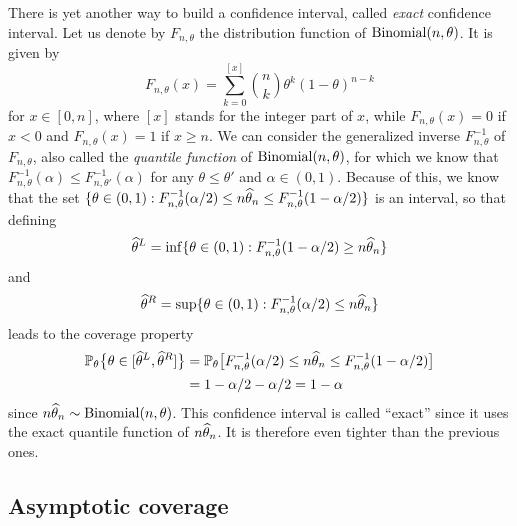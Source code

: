 There is yet another way to build a confidence interval, called \emph{exact} confidence interval.
Let us denote by $F_{n, \theta}$ the distribution function of $\operatorname{Binomial}(n, \theta)$. 
It is given by
\begin{equation}
	\label{eq:binomial_distribution}
	F_{n, \theta}(x) = \sum_{k=0}^{[x]}\binom{n}{k} \theta^k (1 - \theta)^{n - k}
\end{equation}
for $x \in [0, n]$, where $[x]$ stands for the integer part of $x$, while $F_{n, \theta}(x) = 0$ if $x < 0$ and $F_{n, \theta}(x) = 1$ if $x \geq n$.
We can consider the generalized inverse $F_{n, \theta}^{-1}$ of $F_{n, \theta}$,  also called the \emph{quantile function} of $\operatorname{Binomial}(n, \theta)$, for which we know that $F_{n, \theta}^{-1}(\alpha) \leq F_{n, \theta'}^{-1}(\alpha)$ for any $\theta \leq \theta'$ and $\alpha \in (0, 1)$.%
Because of this, we know that the set $\{ \theta \in (0, 1) : F_{n, \theta}^{-1}(\alpha / 2) \leq n \widehat \theta_n \leq F_{n, \theta}^{-1}(1 - \alpha / 2) \}$ is an interval, so that defining
\begin{equation*}
	\widehat \theta^L = \inf\{ \theta \in (0, 1) : F_{n, \theta}^{-1}(1 - \alpha / 2) \geq n \widehat \theta_n  \}
\end{equation*}
and
\begin{equation*}
	\widehat \theta^R = \sup\{ \theta \in (0, 1) : F_{n, \theta}^{-1}(\alpha / 2) \leq n \widehat \theta_n  \}
\end{equation*}
leads to the coverage property
\begin{align*}
	\mathbb P_\theta \big\{ \theta \in [\widehat \theta^L, \widehat \theta^R] \big\} 
	&= \mathbb P_\theta\big[ F_{n, \theta}^{-1}(\alpha / 2) \leq n \widehat \theta_n \leq F_{n, \theta}^{-1}(1 - \alpha / 2) \big] \\
	&= 1 - \alpha / 2 - \alpha / 2 = 1 - \alpha
\end{align*}
since $n \widehat \theta_n \sim \operatorname{Binomial}(n, \theta)$.
This confidence interval is called ``exact'' since it uses the exact quantile function of $n \widehat \theta_n$. It is therefore even tighter than the previous ones.



\subsection{Asymptotic coverage} %
\label{sub:asymptotic_coverage}

